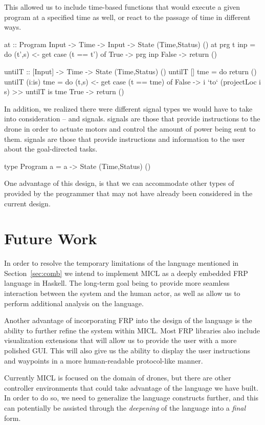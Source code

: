 \documentclass[11pt]{article}
\begin{document}
This allowed us to include time-based functions that would execute a given
program at a specified time as well, or react to the passage of time in
different ways.

\begin{program}
at :: Program Input -> Time -> Input -> State (Time,Status) ()
at prg t inp = do (t',s) <- get
                  case (t == t') of
                    True  -> prg inp
                    False -> return ()

untilT :: [Input] -> Time -> State (Time,Status) ()
untilT []     tme = do return ()
untilT (i:is) tme = do (t,s) <- get
                       case (t == tme) of
                         False -> i `to` (projectLoc i s) >> untilT is tme
                         True  -> return ()
\end{program}

In addition, we realized there were different signal types we would have to
take into consideration --  and 
signals.  signals are those that provide instructions to the drone
in order to actuate motors and control the amount of power being sent to
them.  signals are those that provide instructions and
information to the user about the goal-directed tasks.

\begin{program}
type Program a = a -> State (Time,Status) ()
\end{program}

One advantage of this design, is that we can accommodate other types of
 provided by the programmer that may not have already been
considered in the current design.


\section{Future Work}
\label{sec:future}
In order to resolve the temporary limitations of the language mentioned in
Section~\ref{sec:comb} we intend to implement MICL as a deeply embedded FRP
language in Haskell. The long-term goal being to provide more seamless
interaction between the system and the human actor, as well as allow us to
perform additional analysis on the language.

Another advantage of incorporating FRP into the design of the language is the
ability to further refine the  system within MICL. Most FRP
libraries also include visualization extensions that will allow us to provide
the user with a more polished GUI. This will also give us the ability to
display the user instructions and waypoints in a more human-readable
protocol-like manner.

Currently MICL is focused on the domain of drones, but there are other
controller environments that could take advantage of the language we have
built. In order to do so, we need to generalize the language constructs
further, and this can potentially be assisted through the \emph{deepening} of
the language into a \emph{final} form.




\end{document}
